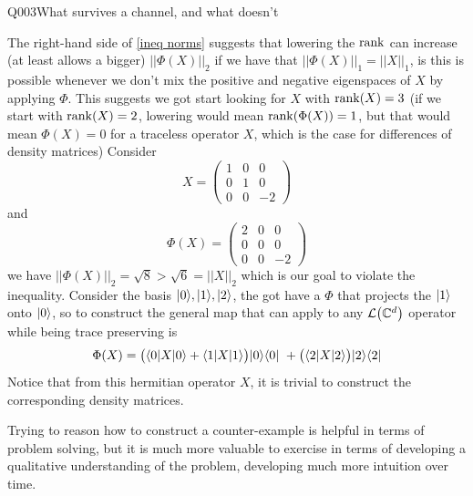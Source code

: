 \begin{entry}{Q003}{What survives a channel, and what doesn't}
\begin{solution}[Part (b)]
The right-hand side of \eqref{ineq norms} suggests that lowering the $\operatorname{rank}$ can increase (at least allows a bigger) $||\Phi(X)||_2$ if we have that $||\Phi(X)||_1 = ||X||_1$, is this is possible whenever we don't mix the positive and negative eigenspaces of $X$ by applying $\Phi$. This suggests we got start looking for $X$ with $\operatorname{rank}(X)=3$ (if we start with $\operatorname{rank}(X)=2$, lowering would mean $\operatorname{rank}(\Phi(X))=1$, but that would mean $\Phi(X)=0$ for a traceless operator $X$, which is the case for differences of density matrices)
Consider
\begin{equation}
    X= \begin{pmatrix}
        1 & 0 & 0\\
        0 & 1 & 0\\
        0 & 0 & -2
    \end{pmatrix}
\end{equation}
and 
\begin{equation}
    \Phi(X)= \begin{pmatrix}
        2 & 0 & 0\\
        0 & 0 & 0\\
        0 & 0 & -2
    \end{pmatrix}
\end{equation}
we have 
$||\Phi(X)||_2=\sqrt{8}>\sqrt{6}=||X||_2$ which is our goal to violate the inequality.
Consider the basis $\lvert 0 \rangle, \lvert 1 \rangle,\lvert 2 \rangle$, the got have a $\Phi$ that projects the $\lvert 1 \rangle$ onto $\lvert 0 \rangle$, so to construct the general map that can apply to any $\mathcal{L}\!\left(\mathbb{C}^{d}\right)$ operator while being trace preserving is
\begin{equation}
    \Phi(X)= \big( \langle 0 \rvert X\lvert 0 \rangle+ \langle 1 \rvert X\lvert 1 \rangle\big) \lvert 0 \rangle\langle 0 \rvert \ + \big(  \langle 2 \rvert X\lvert 2 \rangle\big) \lvert 2 \rangle\langle 2 \rvert
\end{equation}
Notice that from this hermitian operator $X$, it is trivial to construct the corresponding density matrices.
\end{solution}

\begin{takeaway}
Trying to reason how to construct a counter-example is helpful in terms of problem solving, but it is much more valuable to exercise in terms of developing a qualitative understanding of the problem, developing much more intuition over time. 
\end{takeaway}


\end{entry}
